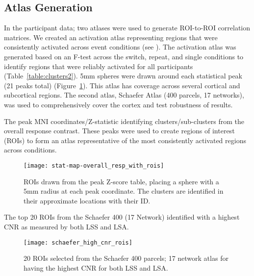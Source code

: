 \documentclass[phd,appendix,figures]{uithesis}
\begin{document}
\subsection*{Atlas Generation}
\label{methods:atlas-corr-analysis2}

In the participant data; two atlases were used to generate ROI-to-ROI correlation matrices.
We created an activation atlas representing regions that were
consistently activated across event conditions (see ).
The activation atlas was generated based on an F-test across the switch, repeat, and single conditions
to identify regions that were reliably activated for all participants (Table~\ref{table:clusters2}).
5mm spheres were drawn around each statistical peak (21 peaks total) (Figure~\ref{fig:methroimap2}).
This atlas has coverage across several cortical and subcortical regions.
The second atlas, Schaefer Atlas (400 parcels, 17 networks)\cite{Schaefer2017}, was
used to comprehensively cover the cortex and test robustness of results.


\begin{table}[H]
  \caption{
    The peak MNI coordinates/Z-statistic identifying clusters/sub-clusters from the overall
    response contrast.
    These peaks were used to create regions of interest (ROIs) to form an atlas representative
    of the most consistently activated regions across conditions.
  }
  \label{table:clusters2}
\end{table}

\begin{figure}[H]
  \centering
  \texttt{[image: stat-map-overall\_resp\_with\_rois]}
  \caption[Activation Atlas]{
    ROIs drawn from the peak Z-score table, placing a sphere with a 5mm radius
    at each peak coordinate.
    The clusters are identified in their approximate locations
    with their ID.
  }
  \label{fig:methroimap2}
\end{figure}

\begin{table}[H]
  \caption{
    The top 20 ROIs from the Schaefer 400 (17 Network) identified with a highest CNR as measured by
    both LSS and LSA.
  }
  \label{table:parcels2}
\end{table}

\begin{figure}[H]
  \centering
  \texttt{[image: schaefer\_high\_cnr\_rois]}
  \caption[SchaeferTop20 Atlas]{
    20 ROIs selected from the Schaefer 400 parcels; 17 network atlas for having the
    highest CNR for both LSS and LSA.
  }
  \label{fig:schaefertopmap2}
\end{figure}
\end{document}
